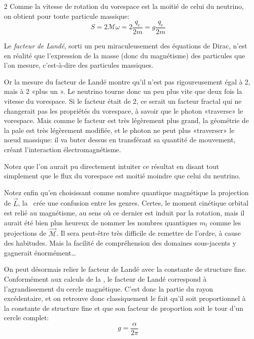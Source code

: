 \begin{multicols}{2}
Comme la vitesse de rotation du vorespace est la moitié de celui du neutrino, on obtient pour toute particule massique:
\begin{equation*}
	S = 2  \mathcal{M} \omega = 2 \frac{q_e}{2 m} = g \frac{q_e}{2 m}
\end{equation*}

%


Le \textit{facteur de Landé}, sorti un peu miraculeusement des équations de Dirac\cite{dirac1928quantum}, n'est en réalité que l'expression de la masse (donc du magnétisme) des particules que l'on mesure, c'est-à-dire des particules massiques.

Or la mesure du facteur de Landé montre qu'il n'est pas rigoureusement égal à 2, mais à 2 «plus un ». Le neutrino tourne donc un peu plus vite que deux fois la vitesse du vorespace. Si le facteur était de 2, ce serait un facteur fractal qui ne changerait pas les propriétés du vorespace, à savoir que le photon «traverse» le vorespace. Mais comme le facteur est très légèrement plus grand, la géométrie de la pale est très légèrement modifiée, et le photon ne peut plus «traverser» le nœud massique: il va buter dessus en transférant sa quantité de mouvement, créant l'interaction électromagnétisme.

Notez que l'on aurait pu directement intuiter ce résultat en disant tout simplement que le flux du vorespace est moitié moindre que celui du neutrino.

Notez enfin qu'en choisissant comme nombre quantique magnétique la projection de $\vec{L}$, la \MQ\ crée une confusion entre les genres. Certes, le moment cinétique orbital est relié au magnétisme, au sens où ce dernier est induit par la rotation, mais il aurait été bien plus heureux de nommer les nombres quantiques $m_l$ comme les projections de $\vec{\mathcal{M}}$. Il sera peut-être très difficile de remettre de l'ordre, à cause des habitudes. Mais la facilité de compréhension des domaines sous-jacents y gagnerait énormément\dots
\medskip

On peut désormais relier le facteur de Landé avec la constante de structure fine. Conformément aux calculs de la \MQ, le facteur de Landé correspond à l'agrandissement du cercle magnétique. C'est donc la partie du rayon excédentaire, et on retrouve donc classiquement le fait qu'il soit proportionnel à la constante de structure fine et que son facteur de proportion soit le tour d'un cercle complet:
\begin{equation*}
	g = \frac{\alpha}{2\pi}
\end{equation*} 


\end{multicols}

